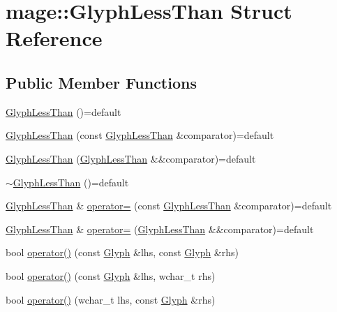\hypertarget{structmage_1_1_glyph_less_than}{}\section{mage\+:\+:Glyph\+Less\+Than Struct Reference}
\label{structmage_1_1_glyph_less_than}
\subsection*{Public Member Functions}
\begin{DoxyCompactItemize}
\item 
\hyperlink{structmage_1_1_glyph_less_than_a2ad76294131749c19d83b6f92c74f1dc}{Glyph\+Less\+Than} ()=default
\item 
\hyperlink{structmage_1_1_glyph_less_than_a27fc34d9db41ebba7a7b40864837e7e7}{Glyph\+Less\+Than} (const \hyperlink{structmage_1_1_glyph_less_than}{Glyph\+Less\+Than} \&comparator)=default
\item 
\hyperlink{structmage_1_1_glyph_less_than_ae41c3b9b7ecf202b5518f911342e170c}{Glyph\+Less\+Than} (\hyperlink{structmage_1_1_glyph_less_than}{Glyph\+Less\+Than} \&\&comparator)=default
\item 
\hyperlink{structmage_1_1_glyph_less_than_ace50804a419a31b0413566b5aba2eeac}{$\sim$\+Glyph\+Less\+Than} ()=default
\item 
\hyperlink{structmage_1_1_glyph_less_than}{Glyph\+Less\+Than} \& \hyperlink{structmage_1_1_glyph_less_than_aa3de6a126c3a70ad452a17b37709eca6}{operator=} (const \hyperlink{structmage_1_1_glyph_less_than}{Glyph\+Less\+Than} \&comparator)=default
\item 
\hyperlink{structmage_1_1_glyph_less_than}{Glyph\+Less\+Than} \& \hyperlink{structmage_1_1_glyph_less_than_aeee354f70d70e708e7478066c38166b2}{operator=} (\hyperlink{structmage_1_1_glyph_less_than}{Glyph\+Less\+Than} \&\&comparator)=default
\item 
bool \hyperlink{structmage_1_1_glyph_less_than_a909ab77ec919121f782655a6f9898c1a}{operator()} (const \hyperlink{structmage_1_1_glyph}{Glyph} \&lhs, const \hyperlink{structmage_1_1_glyph}{Glyph} \&rhs)
\item 
bool \hyperlink{structmage_1_1_glyph_less_than_a2a716c7633165ef0382300a6a800766a}{operator()} (const \hyperlink{structmage_1_1_glyph}{Glyph} \&lhs, wchar\+\_\+t rhs)
\item 
bool \hyperlink{structmage_1_1_glyph_less_than_a213602e0f23118c87c3b982c42c35479}{operator()} (wchar\+\_\+t lhs, const \hyperlink{structmage_1_1_glyph}{Glyph} \&rhs)
\end{DoxyCompactItemize}


